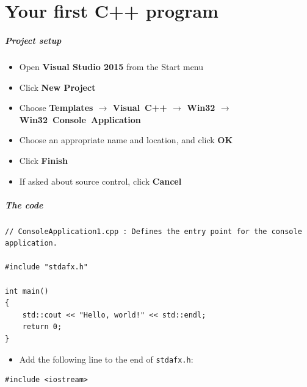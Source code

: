 \part{Your first C++ program}
\frame{\partpage}

\begin{frame}
	\frametitle{Project setup}
	\begin{itemize}
		\item Open \textbf{Visual Studio 2015} from the Start menu
		\item Click \textbf{New Project}
		\item Choose \textbf{Templates $\to$ Visual~C++ $\to$ Win32 $\to$ Win32~Console~Application}
		\item Choose an appropriate name and location, and click \textbf{OK}
		\item Click \textbf{Finish}
		\item If asked about source control, click \textbf{Cancel}
	\end{itemize}
\end{frame}

\begin{frame}[fragile]
	\frametitle{The code}
	\begin{lstlisting}
// ConsoleApplication1.cpp : Defines the entry point for the console application.

#include "stdafx.h"

int main()
{
    std::cout << "Hello, world!" << std::endl;
    return 0;
}
	\end{lstlisting}
	\begin{itemize}
		\item Add the following line to the end of \texttt{stdafx.h}:
	\end{itemize}
	\begin{lstlisting}
#include <iostream>
	\end{lstlisting}
\end{frame}

